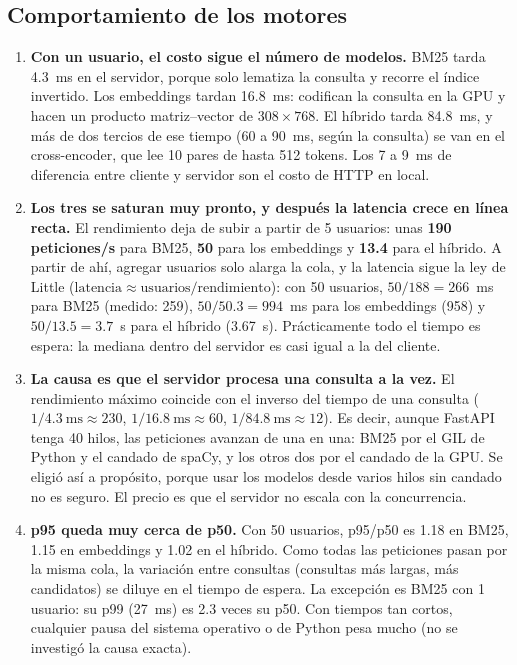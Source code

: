 \documentclass[11pt,letterpaper]{article}
\begin{document}
\subsection{Comportamiento de los motores}

\begin{enumerate}
\item \textbf{Con un usuario, el costo sigue el número de modelos.} BM25 tarda 4.3~ms en el servidor, porque solo lematiza la consulta y recorre el índice invertido. Los embeddings tardan 16.8~ms: codifican la consulta en la GPU y hacen un producto matriz--vector de $308 \times 768$. El híbrido tarda 84.8~ms, y más de dos tercios de ese tiempo (60 a 90~ms, según la consulta) se van en el cross-encoder, que lee 10 pares de hasta 512 tokens. Los 7 a 9~ms de diferencia entre cliente y servidor son el costo de HTTP en local.

\item \textbf{Los tres se saturan muy pronto, y después la latencia crece en línea recta.} El rendimiento deja de subir a partir de 5 usuarios: unas \textbf{190 peticiones/s} para BM25, \textbf{50} para los embeddings y \textbf{13.4} para el híbrido. A partir de ahí, agregar usuarios solo alarga la cola, y la latencia sigue la ley de Little ($\text{latencia} \approx \text{usuarios} / \text{rendimiento}$): con 50 usuarios, $50/188 = 266$~ms para BM25 (medido: 259), $50/50.3 = 994$~ms para los embeddings (958) y $50/13.5 = 3.7$~s para el híbrido (3.67~s). Prácticamente todo el tiempo es espera: la mediana dentro del servidor es casi igual a la del cliente.

\item \textbf{La causa es que el servidor procesa una consulta a la vez.} El rendimiento máximo coincide con el inverso del tiempo de una consulta ($1/4.3~\text{ms} \approx 230$, $1/16.8~\text{ms} \approx 60$, $1/84.8~\text{ms} \approx 12$). Es decir, aunque FastAPI tenga 40 hilos, las peticiones avanzan de una en una: BM25 por el GIL de Python y el candado de spaCy, y los otros dos por el candado de la GPU. Se eligió así a propósito, porque usar los modelos desde varios hilos sin candado no es seguro. El precio es que el servidor no escala con la concurrencia.

\item \textbf{p95 queda muy cerca de p50.} Con 50 usuarios, p95/p50 es 1.18 en BM25, 1.15 en embeddings y 1.02 en el híbrido. Como todas las peticiones pasan por la misma cola, la variación entre consultas (consultas más largas, más candidatos) se diluye en el tiempo de espera. La excepción es BM25 con 1 usuario: su p99 (27~ms) es 2.3 veces su p50. Con tiempos tan cortos, cualquier pausa del sistema operativo o de Python pesa mucho (no se investigó la causa exacta).


\end{enumerate}
\end{document}
